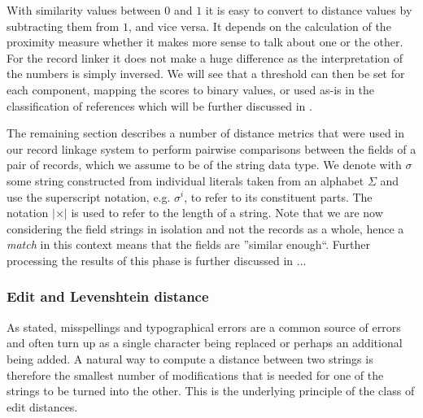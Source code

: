 \documentclass[paper=a4, fontsize=11pt]{scrartcl}
\begin{document}
With similarity values between $0$ and $1$ it is easy to convert to distance values by subtracting them from $1$, and vice versa.
It depends on the calculation of the proximity measure whether it makes more sense to talk about one or the other.
For the record linker it does not make a huge difference as the interpretation of the numbers is simply inversed.
We will see that a threshold can then be set for each component, mapping the scores to binary values, or used as-is in the classification of references which will be further discussed in .

The remaining section describes a number of distance metrics that were used in our record linkage system to perform pairwise comparisons between the fields of a pair of records, which we assume to be of the string data type.
We denote with $\sigma$ some string constructed from individual literals taken from an alphabet $\Sigma$ and use the superscript notation, e.g. $\sigma^{i}$, to refer to its constituent parts.
The notation $\vert \times \vert$ is used to refer to the length of a string.
Note that we are now considering the field strings in isolation and not the records as a whole, hence a \emph{match} in this context means that the fields are ''similar enough``.
Further processing the results of this phase is further discussed in ...

\subsubsection{Edit and Levenshtein distance}
\label{sec:edit_distance}
As stated, misspellings and typographical errors are a common source of errors and often turn up as a single character being replaced or perhaps an additional being added.
A natural way to compute a distance between two strings is therefore the smallest number of modifications that is needed for one of the strings to be turned into the other.
This is the underlying principle of the class of edit distances.
\end{document}
